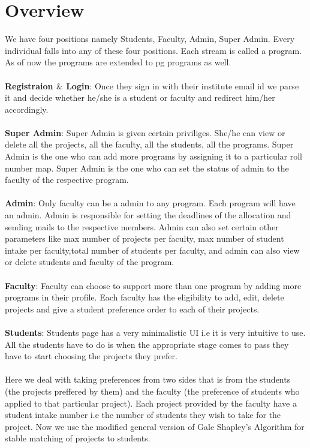 \documentclass{article}
\begin{document}
\section{Overview}
We have four positions namely Students, Faculty, Admin, Super Admin. Every individual falls into any of these four positions. Each stream is called a program. As of now the programs are extended to pg programs as well.
\\ \\ 
\textbf{Registraion $\&$ Login}: Once they sign in with their institute email id we parse it and        decide whether he/she is a student or faculty and redirect him/her accordingly.
\\ \\
\textbf{Super Admin}: Super Admin is given certain priviliges. She/he can view or delete all the projects, all the faculty, all the students, all the programs. Super Admin is the one who can add more programs by assigning it to a particular roll number map. Super Admin is the one who can set the status of admin to the faculty of the respective program.
\\ \\
\textbf{Admin}: Only faculty can be a admin to any program. Each program will have an admin. Admin is responsible for setting the deadlines of the allocation and sending mails to the respective members. Admin can also set certain other parameters like max number of projects per faculty, max number of student intake per faculty,total number of students per faculty, and admin can also view or delete students and faculty of the program.
\\ \\
\textbf{Faculty}: Faculty can choose to support more than one program by adding more programs in their profile. Each faculty has the eligibility to add, edit, delete projects and give a student preference order to each of their projects.
\\ \\
\textbf{Students}: Students page has a very minimalistic UI i.e it is very intuitive to use. All the students have to do is when the appropriate stage comes to pass they have to start choosing the projects they prefer.
\\ \\
Here we deal with taking preferences from two sides that is from the students (the projects preffered by them) and the faculty (the preference of students who applied to that particular project). Each project provided by the faculty have a student intake number i.e the number of students they wish to take for the project. Now we use the modified general version of Gale Shapley's Algorithm for stable matching of projects to students. 
\end{document}
